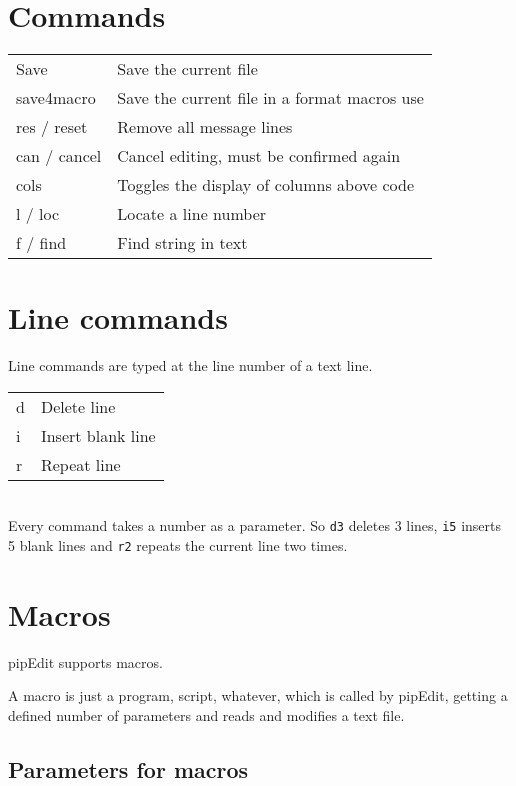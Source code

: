 \documentclass{report}
\begin{document}
\chapter{Commands}

\begin{tabular}{l l}
Save & Save the current file \\
save4macro & Save the current file in a format macros use \\
res / reset & Remove all message lines \\
can / cancel & Cancel editing, must be confirmed again \\
cols & Toggles the display of columns above code \\
l / loc & Locate a line number \\
f / find & Find string in text \\
\end{tabular}



\chapter{Line commands}

Line commands are typed at the line number of a text line. \\ 

\begin{tabular}{l l}
d & Delete line \\
i & Insert blank line \\
r & Repeat line \\
\end{tabular} \\

Every command takes a number as a parameter.
So \texttt{d3} deletes 3 lines, \texttt{i5} inserts 5 blank lines and
\texttt{r2} repeats the current line two times.





\chapter{Macros}

pipEdit supports macros.

A macro is just a program, script, whatever, which is called by pipEdit, 
getting a defined number of parameters and reads and modifies a text file.

\section{Parameters for macros}
\end{document}
